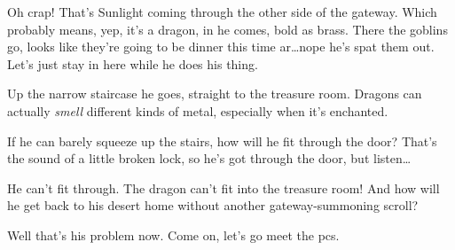 \begin{multicols}{2}
\begin{exampletext}
Oh crap!
That's Sunlight coming through the other side of the gateway.
Which probably means, yep, it's a dragon, in he comes, bold as brass.
There the goblins go, looks like they're going to be dinner this time ar\ldots nope he's spat them out.
Let's just stay in here while he does his thing.

Up the narrow staircase he goes, straight to the treasure room.
Dragons can actually \emph{smell} different kinds of metal, especially when it's enchanted.

If he can barely squeeze up the stairs, how will he fit through the door?
That's the sound of a little broken lock, so he's got through the door, but listen\ldots

He can't fit through.
The dragon can't fit into the treasure room!
And how will he get back to his desert home without another gateway-summoning scroll?

Well that's his problem now.
Come on, let's go meet the \glspl{pc}.

\end{exampletext}
\end{multicols}
